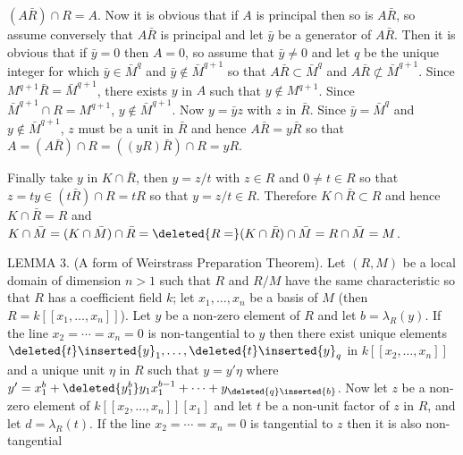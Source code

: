 $(A\bar R)\cap R=A$. Now it is obvious that if $A$ is principal then so is $A\bar R$, so assume conversely that $A\bar R$ is principal and let $\bar y$ be a generator of $A\bar R$. Then it is obvious that if $\bar y=0$ then $A=0$, so assume that $\bar y\ne0$ and let $q$ be the unique integer for which $\bar y\in\bar M^q$ and $\bar y\notin\bar M^{q+1}$ so that $A\bar R\subset\bar M^q$ and $A\bar R\not\subset\bar M^{q+1}$. Since $M^{q+1}\bar R=\bar M^{q+1}$, there exists $y$ in $A$ such that $y\notin M^{q+1}$. Since $\bar M^{q+1}\cap R=M^{q+1}$, $y\notin\bar M^{q+1}$. Now $y=\bar yz$ with $z$ in $\bar R$. Since $\bar y=\bar M^q$ and $y\notin\bar M^{q+1}$, $z$ must be a unit in $\bar R$ and hence $A\bar R=y\bar R$ so that $A=(A\bar R)\cap R=((yR)\bar R)\cap R=yR$.

Finally take $y$ in $K\cap\bar R$, then $y=z/t$ with $z\in R$ and $0\ne t\in R$ so that $z=ty\in(t\bar R)\cap R=tR$ so that $y=z/t\in R$. Therefore $K\cap\bar R\subset R$ and hence $K\cap\bar R=R$ and $K\cap\bar M=(K\cap\bar M)\cap\bar R=\deleted{R=}(K\cap\bar R)\cap\bar M=R\cap\bar M=M$.

LEMMA 3. (A form of Weirstrass Preparation Theorem). Let $(R,M)$ be a local domain of dimension $n>1$ such that $R$ and $R/M$ have the same characteristic so that $R$ has a coefficient field $k$; let $x_1,\ldots,x_n$ be a basis of $M$ (then $R=k[[x_1,\ldots,x_n]]$). Let $y$ be a non-zero element of $R$ and let $b=\lambda_R(y)$. If the line $x_2=\cdots=x_n=0$ is non-tangential to $y$ then there exist unique elements $\deleted{t}\inserted{y}_1,\ldots,\deleted{t}\inserted{y}_q$ in $k[[x_2,\ldots,x_n]]$ and a unique unit $\eta$ in $R$ such that $y=y'\eta$ where $y'=x_1^b+\deleted{y_1^b}y_1x_1^{b-1}+\cdots+y_{\deleted{q}\inserted{b}}$. Now let $z$ be a non-zero element of $k[[x_2,\ldots,x_n]][x_1]$ and let $t$ be a non-unit factor of $z$ in $R$, and let $d=\lambda_R(t)$. If the line $x_2=\cdots=x_n=0$ is tangential to $z$ then it is also non-tangential
